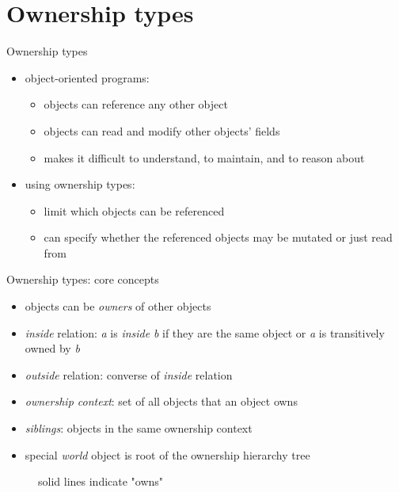 \documentclass{beamer}
\begin{document}
\section{Ownership types}

\begin{frame}{Ownership types}
\begin{itemize}
  \item object-oriented programs:
  \begin{itemize}
    \item objects can reference any other object
    \item objects can read and modify other objects' fields
    \item makes it difficult to understand, to maintain, and to reason about
  \end{itemize}
  \item using ownership types:
  \begin{itemize}
    \item limit which objects can be referenced
    \item can specify whether the referenced objects may be mutated or just read from
  \end{itemize}
\end{itemize}
\end{frame}


\begin{frame}{Ownership types: core concepts}
\begin{itemize}
  \item objects can be \emph{owners} of other objects
  \item \emph{inside} relation: \emph{a} is \emph{inside} \emph{b} if they are the same object or \emph{a} is transitively owned by \emph{b}
  \item \emph{outside} relation: converse of \emph{inside} relation
  \item \emph{ownership context}: set of all objects that an object owns
  \item \emph{siblings}: objects in the same ownership context
  \item special \emph{world} object is root of the ownership hierarchy tree
\end{itemize}

\begin{figure}[fragile]

  \caption{solid lines indicate "owns"}
\end{figure}
\end{frame}
\end{document}

